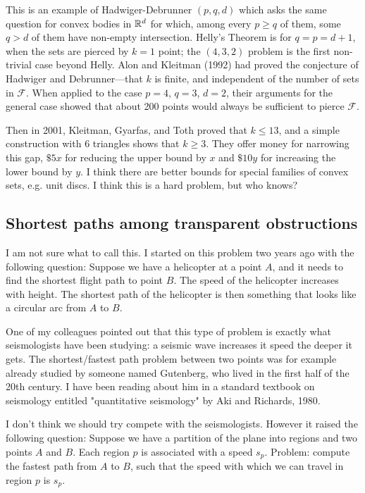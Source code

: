 \documentclass{patmorin}
\newcommand{\poser}[1]{\noindent{\textit{#1}}}
\begin{document}
This is an example of Hadwiger-Debrunner $(p,q,d)$ which asks the same
question for convex bodies in $\mathbb{R}^d$ for which, among every $p\ge q$
of them, some $q > d$ of them have non-empty intersection. Helly’s
Theorem is for $q = p = d + 1$, when the sets are pierced by $k = 1$
point; the $(4,3,2)$ problem is the first non-trivial case beyond Helly.
Alon and Kleitman (1992) had proved the conjecture of Hadwiger and
Debrunner---that $k$ is finite, and independent of the number of sets
in $\mathcal{F}$. When applied to the case $p = 4$, $q = 3$, $d = 2$,
their arguments for the general case showed that about 200 points would
always be sufficient to pierce $\mathcal{F}$.

Then in 2001, Kleitman, Gyarfas, and Toth proved that $k\le 13$, and
a simple construction with 6 triangles shows that $k\ge 3$. They offer
money for narrowing this gap, $\$5x$ for reducing the upper bound by $x$
and $\$10y$ for increasing the lower bound by $y$.  I think there are
better bounds for special families of convex sets, e.g. unit discs. I
think this is a hard problem, but who knows?


\subsection{Shortest paths among transparent obstructions}

\poser{Henk Meijer}                 

I am not sure what to call this. I started on this problem two years ago
with the following question: Suppose we have a helicopter at a point $A$,
and it needs to find the shortest flight path to point $B$. The speed of
the helicopter increases with height.  The shortest path of the helicopter
is then something that looks like a circular arc from $A$ to $B$.

One of my colleagues pointed out that this type  of problem  is exactly
what seismologists have been studying:  a seismic wave increases it
speed the deeper it gets.  The shortest/fastest path problem between
two points was for example already studied by someone named Gutenberg,
who lived in the first half of the 20th century.  I have been reading
about him in a standard textbook on seismology entitled "quantitative
seismology" by Aki and Richards, 1980.

I don't think we should try compete with the seismologists.  However it
raised the following question: Suppose we have a partition of the plane
into regions and two points $A$ and $B$.  Each region $p$ is associated
with a speed $s_p$.  Problem: compute the fastest path from $A$ to $B$,
such that the speed with which we can travel in region $p$ is $s_p$.
\end{document}

